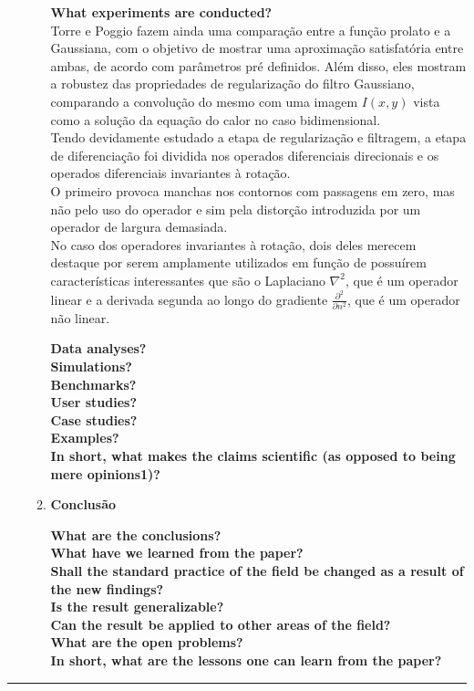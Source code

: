 \begin{enumerate}
\begin{enumerate}[label*=\arabic*.]
    \textbf{What experiments are conducted?}\\
    Torre e Poggio fazem ainda uma comparação entre a função prolato e a Gaussiana, com o objetivo de mostrar uma aproximação satisfatória entre ambas, de acordo com parâmetros pré definidos. Além disso, eles mostram a robustez das propriedades de regularização do filtro Gaussiano, comparando a convolução do mesmo com uma imagem $I(x, y)$ vista como a solução da equação do calor no caso bidimensional.\\
    Tendo devidamente estudado a etapa de regularização e filtragem, a etapa de diferenciação foi dividida nos operados diferenciais direcionais e os operados diferenciais invariantes à rotação.\\
    O primeiro provoca manchas nos contornos com passagens em zero, mas não pelo uso do operador e sim pela distorção introduzida por um operador de largura demasiada.\\
    No caso dos operadores invariantes à rotação, dois deles merecem destaque por serem amplamente utilizados em função de possuírem características interessantes que são o Laplaciano $\nabla ^2$, que é um operador linear e a derivada segunda ao longo do gradiente $\frac{\partial^2}{\partial n^2}$, que é um operador não linear.
    
    
    \textbf{Data analyses?}\\
    \textbf{Simulations?\\ Benchmarks?}\\
    \textbf{User studies?}\\
    \textbf{Case studies?}\\
    \textbf{Examples?}\\
    \textbf{In short, what makes the claims scientific (as opposed to being mere opinions1)?}
    \\[6pt]

    \item \textbf{Conclusão}
    
    \textbf{What are the conclusions?}\\
    \textbf{What have we learned from the paper?}\\
    \textbf{Shall the standard practice of the field be changed as a result of the new findings?}\\
    \textbf{Is the result generalizable?}\\
    \textbf{Can the result be applied to other areas of the field?}\\
    \textbf{What are the open problems?}\\
    \textbf{In short, what are the lessons one can learn from the paper?}

\end{enumerate}
\end{enumerate}

\noindent\rule{14.5cm}{0.4pt}